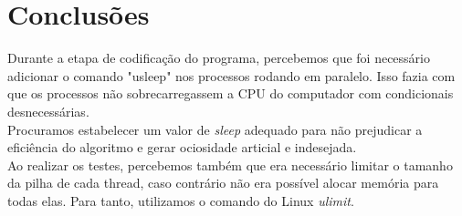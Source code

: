 \documentclass[12pt,a4paper]{article}
\begin{document}
\pagebreak
\section{Conclusões}
Durante a etapa de codificação do programa, percebemos que foi necessário
adicionar o comando "usleep" nos processos rodando em paralelo. Isso fazia com que 
os processos não sobrecarregassem a CPU do computador com condicionais desnecessárias.
\\
Procuramos estabelecer um valor de \textit{sleep} adequado para não prejudicar a eficiência 
do algoritmo e gerar ociosidade articial e indesejada.
\\
Ao realizar os testes, percebemos também que era necessário limitar o tamanho
da pilha de cada thread, caso contrário não era possível alocar memória para todas elas. 
Para tanto, utilizamos o comando do Linux \textit{ulimit}.
\end{document}
